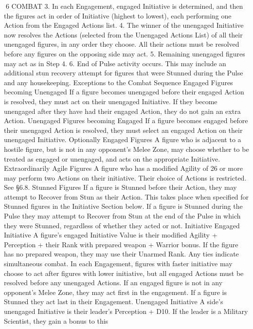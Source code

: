 \documentclass[a4paper]{article}
\begin{document}
\begin{multicols}{3}
6 COMBAT
3. In each Engagement, engaged Initiative is determined, and then the figures act in order of Initiative (highest to lowest), each performing one Action from the Engaged Actions list.
4. The winner of the unengaged Initiative now
resolves the Actions (selected from the Unengaged
Actions List) of all their unengaged figures, in any
order they choose. All their actions must be resolved before any figures on the opposing side may
act.
5. Remaining unengaged figures may act as in Step
4.
6. End of Pulse activity occurs. This may include
an additional stun recovery attempt for figures that
were Stunned during the Pulse and any housekeeping.
Exceptions to the Combat Sequence
Engaged Figures becoming Unengaged If a
figure becomes unengaged before their engaged
Action is resolved, they must act on their unengaged Initiative. If they become unengaged after
they have had their engaged Action, they do not
gain an extra Action.
Unengaged Figures becoming Engaged If a
figure becomes engaged before their unengaged
Action is resolved, they must select an engaged
Action on their unengaged Initiative.
Optionally Engaged Figures A figure who is
adjacent to a hostile figure, but is not in any opponent’s Melee Zone, may choose whether to be
treated as engaged or unengaged, and acts on the
appropriate Initiative.
Extraordinarily Agile Figures A figure who has a
modified Agility of 26 or more may perform two
Actions on their initiative. Their choice of Actions
is restricted. See §6.8.
Stunned Figures If a figure is Stunned before their
Action, they may attempt to Recover from Stun as
their Action. This takes place when specified for
Stunned figures in the Initiative Section below. If a
figure is Stunned during the Pulse they may attempt to Recover from Stun at the end of the Pulse
in which they were Stunned, regardless of whether
they acted or not.
Initiative
Engaged Initiative A figure’s engaged Initiative
Value is their modified Agility + Perception + their
Rank with prepared weapon + Warrior bonus. If
the figure has no prepared weapon, they may use
their Unarmed Rank. Any ties indicate simultaneous combat. In each Engagement, figures with
faster initiative may choose to act after figures with
lower initiative, but all engaged Actions must be
resolved before any unengaged Actions. If an
engaged figure is not in any opponent’s Melee
Zone, they may act first in the engagement. If a
figure is Stunned they act last in their Engagement.
Unengaged Initiative A side’s unengaged Initiative is their leader’s Perception + D10. If the leader
is a Military Scientist, they gain a bonus to this

\end{multicols}
\end{document}
